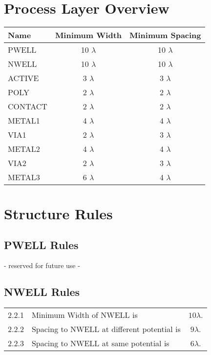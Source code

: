 \section{Process Layer Overview}\label{design_rules_process_layer_overview}

\begin{center}
    \begin{tabular}{|l|c|c|}
    \hline
        \textbf{Name} & \textbf{Minimum Width} & \textbf{Minimum Spacing} \\
    \hline
        PWELL   & 10 $\lambda$ & 10 $\lambda$ \\
        NWELL   & 10 $\lambda$ & 10 $\lambda$ \\
        ACTIVE  & 3  $\lambda$ & 3  $\lambda$ \\
        POLY    & 2  $\lambda$ & 2  $\lambda$ \\
        CONTACT & 2  $\lambda$ & 2  $\lambda$ \\
        METAL1  & 4  $\lambda$ & 4  $\lambda$ \\
        VIA1    & 2  $\lambda$ & 3  $\lambda$ \\
        METAL2  & 4  $\lambda$ & 4  $\lambda$ \\
        VIA2    & 2  $\lambda$ & 3  $\lambda$ \\
        METAL3  & 6  $\lambda$ & 4  $\lambda$ \\
    \hline
    \end{tabular}
\end{center}

\section{Structure Rules}\label{design_rules_structure_rules}

\subsection{PWELL Rules}\label{design_rules_pwell_rules}

\begin{center}
- reserved for future use -
\end{center}

\subsection{NWELL Rules}\label{design_rules_nwell_rules}

\begin{flushleft}
    \begin{tabular}{c l c}
        2.2.1  & Minimum Width of NWELL is & $10 \lambda$. \\
        2.2.2  & Spacing to NWELL at different potential is & $9 \lambda$. \\
        2.2.3  & Spacing to NWELL at same potential is & $6 \lambda$. \\
    \end{tabular}
\end{flushleft}

